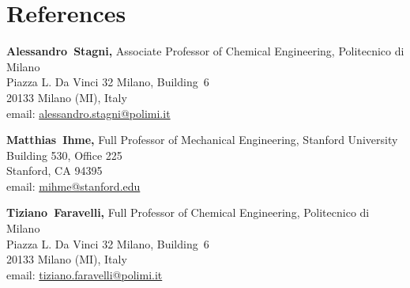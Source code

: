 \section{\sc References}

\vspace*{.05in}
\parbox{\textwidth}
{
    {\bf Alessandro~Stagni,} Associate Professor of Chemical Engineering, Politecnico di Milano \\
    Piazza L. Da Vinci 32 Milano, Building\ 6 \\
    20133 Milano (MI), Italy \\
    email: \href{mailto:alessandro.stagni@polimi.it}{alessandro.stagni@polimi.it} \\
}
\par
\parbox{\textwidth}
{
    {\bf Matthias~Ihme,} Full Professor of Mechanical Engineering, Stanford University \\
    Building 530, Office 225 \\
    Stanford, CA 94395\\
    email: \href{mailto:mihme@stanford.edu}{mihme@stanford.edu}\\
}
\par
\parbox{\textwidth}
{
    {\bf Tiziano~Faravelli,} Full Professor of Chemical Engineering, Politecnico di Milano \\
    Piazza L. Da Vinci 32 Milano, Building\ 6 \\
    20133 Milano (MI), Italy \\
    email: \href{mailto:tiziano.faravelli@polimi.it}{tiziano.faravelli@polimi.it} \\
}
